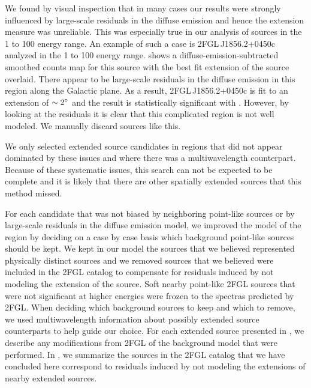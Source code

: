 We found by visual inspection that in many cases our results were strongly
influenced by large-scale residuals in the diffuse emission and hence
the extension measure was unreliable.  This was especially true in our
analysis of sources in the 1 \gev to 100 \gev energy range.  An example
of such a case is 2FGL\,J1856.2+0450c analyzed in the 1 \gev to 100 \gev
energy range.  shows a diffuse-emission-subtracted
smoothed counts map for this source with the best fit extension of
the source overlaid. There appear to be large-scale residuals in
the diffuse emission in this region along the Galactic plane.  As a
result, 2FGL\,J1856.2+0450c is fit to an extension of $\sim2^\circ$
and the result is statistically significant with . However,
by looking at the residuals it is clear that this complicated region is
not well modeled. We manually discard sources like this.

We only selected extended source candidates in regions that did not
appear dominated by these issues and where there was a multiwavelength
counterpart. Because of these systematic issues, this search can not be
expected to be complete and it is likely that there are other spatially
extended sources that this method missed.



For each candidate that was not biased by neighboring point-like
sources or by large-scale residuals in the diffuse emission model, we
improved the model of the region by deciding on a case by case basis
which background point-like sources should be kept.  We kept in our
model the sources that we believed represented physically distinct
sources and we removed sources that we believed were included in the
2FGL catalog to compensate for residuals induced by not modeling the
extension of the source.  Soft nearby point-like 2FGL sources that
were not significant at higher energies were frozen to the spectras
predicted by 2FGL.  When deciding which background sources to keep and
which to remove, we used multiwavelength information about possibly
extended source counterparts to help guide our choice. For each extended
source presented in , we describe any
modifications from 2FGL of the background model that were performed.
In , we summarize the sources in the 2FGL
catalog that we have concluded here correspond to residuals induced by
not modeling the extensions of nearby extended sources.

